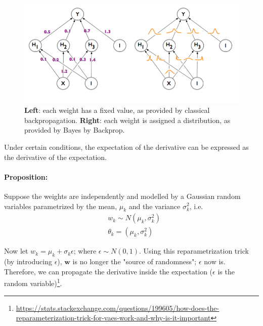 \documentclass[main]{subfiles}
\begin{document}
\begin{figure}[H]
    	\centering
    	\includegraphics[width=0.9\linewidth]{05_LearningAsBayesianInference/figures/BbB_network.png}
    	\caption{\textbf{Left}: each weight has a fixed value, as provided by classical backpropagation. \textbf{Right}: each weight is assigned a distribution, as provided by Bayes by Backprop.} 
    	\label{fig:BbB_network}
    \end{figure}
    


\noindent Under certain conditions, the expectation of the derivative can be expressed as the derivative of the expectation.

\paragraph{Proposition:} Suppose the weights are independently and modelled by a Gaussian random variables parametrized by the mean, $\mu_k$ and the variance $\sigma^2_k$, i.e.
\begin{equation}
    \begin{split}
        & w_k \sim N(\mu_k,\sigma^2_k)\\
        & \theta_k = (\mu_k,\sigma^2_k)
    \end{split}
\end{equation}

\noindent Now let $w_k  = \mu_k + \sigma_k \epsilon$; where $\epsilon \sim N(0,1)$. Using this reparametrization trick (by introducing $\epsilon$), $\bm{w}$ is no longer the "source of randomness"; $\epsilon$ now is. Therefore, we can propagate the derivative inside the expectation ($\epsilon$ is the random variable)\footnote{\url{https://stats.stackexchange.com/questions/199605/how-does-the-reparameterization-trick-for-vaes-work-and-why-is-it-important}}.
\end{document}
